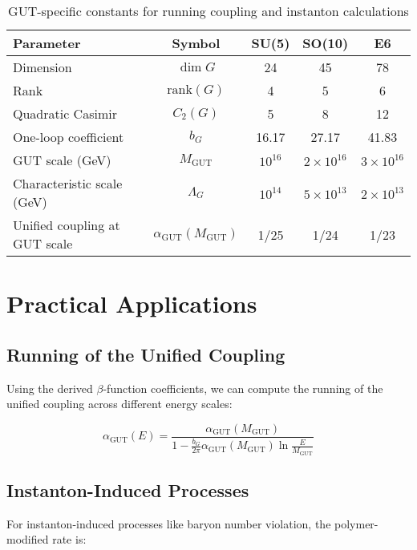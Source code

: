 \documentclass[11pt]{article}
\begin{document}
\begin{table}[ht]
\centering
\begin{tabular}{lcccc}
\toprule
\textbf{Parameter} & \textbf{Symbol} & \textbf{SU(5)} & \textbf{SO(10)} & \textbf{E6} \\
\midrule
Dimension & $\dim G$ & 24 & 45 & 78 \\
Rank & $\mathrm{rank}(G)$ & 4 & 5 & 6 \\
Quadratic Casimir & $C_2(G)$ & 5 & 8 & 12 \\
One-loop coefficient & $b_G$ & 16.17 & 27.17 & 41.83 \\
GUT scale (GeV) & $M_{\mathrm{GUT}}$ & $10^{16}$ & $2 \times 10^{16}$ & $3 \times 10^{16}$ \\
Characteristic scale (GeV) & $\Lambda_G$ & $10^{14}$ & $5 \times 10^{13}$ & $2 \times 10^{13}$ \\
Unified coupling at GUT scale & $\alpha_{\mathrm{GUT}}(M_{\mathrm{GUT}})$ & 1/25 & 1/24 & 1/23 \\
\bottomrule
\end{tabular}
\caption{GUT-specific constants for running coupling and instanton calculations}
\label{tab:gut_constants}
\end{table}

\section{Practical Applications}

\subsection{Running of the Unified Coupling}

Using the derived $\beta$-function coefficients, we can compute the running of the unified coupling across different energy scales:

\begin{equation}
\alpha_{\mathrm{GUT}}(E) = \frac{\alpha_{\mathrm{GUT}}(M_{\mathrm{GUT}})}{1 - \frac{b_G}{2\pi}\alpha_{\mathrm{GUT}}(M_{\mathrm{GUT}})\ln\frac{E}{M_{\mathrm{GUT}}}}
\end{equation}

\subsection{Instanton-Induced Processes}

For instanton-induced processes like baryon number violation, the polymer-modified rate is:
\end{document}
